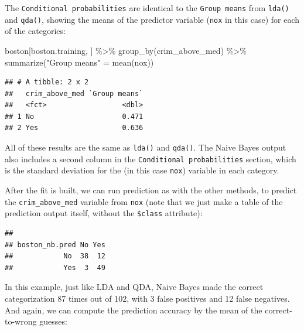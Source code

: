 \documentclass[
]{book}
\newenvironment{Shaded}{\begin{snugshade}}{\end{snugshade}}
\newcommand{\FunctionTok}[1]{\textcolor[rgb]{0.00,0.00,0.00}{#1}}
\newcommand{\NormalTok}[1]{#1}
\newcommand{\OtherTok}[1]{\textcolor[rgb]{0.56,0.35,0.01}{#1}}
\newcommand{\SpecialCharTok}[1]{\textcolor[rgb]{0.00,0.00,0.00}{#1}}
\newcommand{\StringTok}[1]{\textcolor[rgb]{0.31,0.60,0.02}{#1}}
\begin{document}
The \texttt{Conditional\ probabilities} are identical to the \texttt{Group\ means} from \texttt{lda()} and \texttt{qda()}, showing the means of the predictor variable (\texttt{nox} in this case) for each of the categories:

\begin{Shaded}
\begin{Highlighting}[]
\NormalTok{boston[boston.training, ] }\SpecialCharTok{\%\textgreater{}\%}
  \FunctionTok{group\_by}\NormalTok{(crim\_above\_med) }\SpecialCharTok{\%\textgreater{}\%}
  \FunctionTok{summarize}\NormalTok{(}\StringTok{"Group means"} \OtherTok{=} \FunctionTok{mean}\NormalTok{(nox))}
\end{Highlighting}
\end{Shaded}

\begin{verbatim}
## # A tibble: 2 x 2
##   crim_above_med `Group means`
##   <fct>                  <dbl>
## 1 No                     0.471
## 2 Yes                    0.636
\end{verbatim}

All of these results are the same as \texttt{lda()} and \texttt{qda()}. The Naive Bayes output also includes a second column in the \texttt{Conditional\ probabilities} section, which is the standard deviation for the (in this case \texttt{nox}) variable in each category.

After the fit is built, we can run prediction as with the other methods, to predict the \texttt{crim\_above\_med} variable from \texttt{nox} (note that we just make a table of the prediction output itself, without the \texttt{\$class} attribute):

\begin{Shaded}
\end{Shaded}

\begin{verbatim}
##               
## boston_nb.pred No Yes
##            No  38  12
##            Yes  3  49
\end{verbatim}

In this example, just like LDA and QDA, Naive Bayes made the correct categorization 87 times out of 102, with 3 false positives and 12 false negatives. And again, we can compute the prediction accuracy by the mean of the correct-to-wrong guesses:
\end{document}

